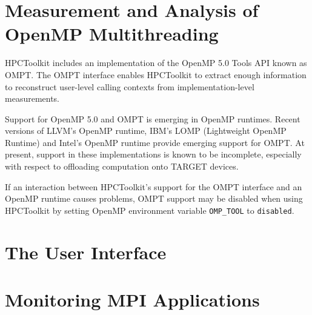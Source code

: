 \documentclass[11pt,letterpaper]{report}
\begin{document}
\chapter{Measurement and Analysis of OpenMP Multithreading}
\label{chpt:gpu}

{
\centering
 \vspace{2ex}
}

HPCToolkit includes an implementation of the OpenMP 5.0 Tools API known as OMPT. The OMPT interface enables HPCToolkit to extract enough information to reconstruct user-level calling contexts from implementation-level measurements.

Support for OpenMP 5.0 and OMPT is emerging in OpenMP runtimes. Recent versions of LLVM's OpenMP runtime, IBM's LOMP (Lightweight OpenMP Runtime) and Intel's OpenMP runtime provide emerging support for OMPT. At present, support in these implementations is known to be incomplete, especially with respect to offloading computation onto TARGET devices.

If an interaction between HPCToolkit's support for the OMPT interface and an OpenMP runtime causes problems, OMPT support may be disabled when using HPCToolkit by setting  OpenMP environment variable {\tt OMP\_TOOL} to {\tt disabled}.





\chapter{The \hpcviewer{} User Interface}
\label{chpt:hpcviewer-interface}







\chapter{Monitoring MPI Applications}
\label{chpt:mpi-apps}
\end{document}
